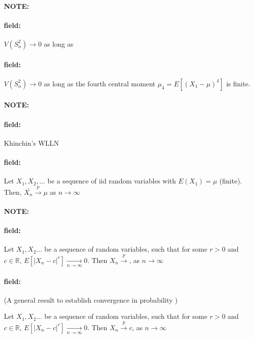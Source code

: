 \documentclass[12pt]{article}
\newenvironment{note}{\paragraph{NOTE:}}{}
\newenvironment{field}{\paragraph{field:}}{}
\begin{document}
\begin{note}
  \begin{field}
    $V(S_n^2) \to 0$ as long as
  \end{field}
  \begin{field}
    $V(S_n^2) \to 0$ as long as the fourth central moment $\mu_4 = E[(X_1 - \mu)^4]$ is finite.
  \end{field}
\end{note}

\begin{note}
  \begin{field}
    Khinchin's WLLN
  \end{field}
  \begin{field}
    Let $X_1, X_2, \ldots$ be a sequence of iid random variables with $E(X_1) = \mu$ (finite). Then, $\bar{X_n} \overset{p}{\to} \mu$ as $n \to \infty$
  \end{field}
\end{note}


\begin{note}
    \begin{field}
      Let $X_1, X_2 \ldots$ be a sequence of random variables, such that for some $r > 0$ and $c \in \mathbb{R}$, $E[|X_n - c|^r] \underset{n \to \infty}{\to} 0$. Then $X_n \overset{p}{\to} $, as $n \to \infty$
    \end{field}
    \begin{field}
      (A general result to establish convergence in probability )

      Let $X_1, X_2 \ldots$ be a sequence of random variables, such that for some $r > 0$ and $c \in \mathbb{R}$, $E[|X_n - c|^r] \underset{n \to \infty}{\to} 0$. Then $X_n \overset{p}{\to} c$, as $n \to \infty$
    \end{field}
\end{note}
\end{document}
